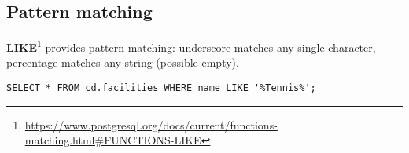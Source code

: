 %

\color{black}
\subsection{Pattern matching}
\textbf{LIKE}\footnote{\url{https://www.postgresql.org/docs/current/functions-matching.html\#FUNCTIONS-LIKE}} provides pattern matching: underscore matches any single character, percentage matches any string (possible empty).
\begin{verbatim}
SELECT * FROM cd.facilities WHERE name LIKE '%Tennis%';
\end{verbatim}

%